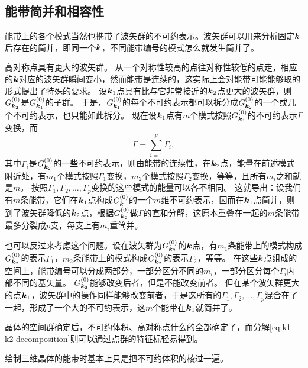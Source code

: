 \subsection{能带简并和相容性}\label{sec:energy-band-consist}

能带上的各个模式当然也携带了波矢群的不可约表示。波矢群可以用来分析固定$\vb*{k}$后存在的简并，即同一个$\vb*{k}$，不同能带编号的模式怎么就发生简并了。

高对称点具有更大的波矢群。
从一个对称性较高的点往对称性较低的点走，相应的$\vb*{k}$对应的波矢群瞬间变小，然而能带是连续的，这实际上会对能带可能能够取的形式提出了特殊的要求。
设$\vb*{k}_1$点具有比与它非常接近的$\vb*{k}_2$点更大的波矢群，则$G_{\vb*{k}_2}^{(0)}$是$G_{\vb*{k}_1}^{(0)}$的子群。
于是，$G_{\vb*{k}_1}^{(0)}$的每个不可约表示都可以拆分成$G_{\vb*{k}_2}^{(0)}$的一个或几个不可约表示，也只能如此拆分。
现在设$\vb*{k}_1$点有$m$个模式按照$G_{\vb*{k}_1}^{(0)}$的不可约表示$\Gamma$变换，而
\begin{equation}
    \Gamma = \sum_{i=1}^p \Gamma_i,
    \label{eq:k1-k2-decomposition}
\end{equation}
其中$\Gamma_i$是$G_{\vb*{k}_2}^{(0)}$的一些不可约表示，则由能带的连续性，在$\vb*{k}_2$点，能量在前述模式附近处，有$m_1$个模式按照$\Gamma_1$变换，$m_2$个模式按照$\Gamma_2$变换，等等，且所有$m_i$之和就是$m$。
按照$\Gamma_1, \Gamma_2, \ldots, \Gamma_p$变换的这些模式的能量可以各不相同。
这就导出：设我们有$m$条能带，它们在$\vb*{k}_1$点构成$G_{\vb*{k}_1}^{(0)}$的一个$m$维不可约表示，因而在$\vb*{k}_1$点简并，则到了波矢群降低的$\vb*{k}_2$点，根据$G_{\vb*{k}_2}^{(0)}$做$\Gamma$的直和分解，这原本重叠在一起的$m$条能带最多分裂成$p$支，每支上有$m_i$重简并。

也可以反过来考虑这个问题。设在波矢群为$G_{\vb*{k}_2}^{(0)}$的$\vb*{k}$点，有$m_1$条能带上的模式构成$G_{\vb*{k}_2}^{(0)}$的表示$\Gamma_1$，$m_2$条能带上的模式构成$G_{\vb*{k}_2}^{(0)}$的表示$\Gamma_2$，等等。
在这些$\vb*{k}$点组成的空间上，能带编号可以分成两部分，一部分区分不同的$m_i$，一部分区分每个$\Gamma_i$内部不同的基矢量。
$G_{\vb*{k}_2}^{(0)}$能够改变后者，但是不能改变前者。
但在某个波矢群更大的点$\vb*{k}_1$，波矢群中的操作同样能够改变前者，于是这所有的$\Gamma_1, \Gamma_2, \ldots, \Gamma_p$混合在了一起，形成了一个大的不可约表示，这$m$个能带在$\vb*{k}_1$就简并了。

晶体的空间群确定后，不可约体积、高对称点什么的全部确定了，而分解\eqref{eq:k1-k2-decomposition}则可以通过点群的特征标轻易得到。

绘制三维晶体的能带时基本上只是把不可约体积的棱过一遍。